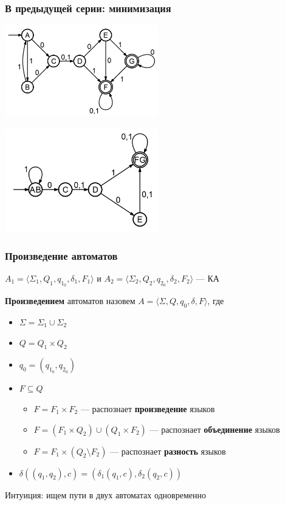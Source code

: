 \documentclass{beamer}
\begin{document}
\begin{frame}[fragile]
  \transwipe[direction=90]
  \frametitle{В предыдущей серии: минимизация}
  \begin{center}
  \includegraphics[width=0.5\textwidth]{pics/2exmin.png}  

  \includegraphics[width=0.5\textwidth]{pics/2exminres.png}  
  \end{center}

\end{frame}

\begin{frame}[fragile]
  \transwipe[direction=90]
  \frametitle{Произведение автоматов}
   $A_1 = \langle \Sigma_1, Q_1, q_{1_0}, \delta_1, F_1 \rangle$ и $A_2 = \langle \Sigma_2, Q_2, q_{2_0}, \delta_2, F_2 \rangle$ --- КА
  
  \textbf{Произведением} автоматов назовем $A = \langle \Sigma, Q, q_0, \delta, F \rangle$, где
  \begin{itemize}
    \item $\Sigma = \Sigma_1 \cup \Sigma_2$
    \item $Q = Q_1 \times Q_2$
    \item $q_0 = (q_{1_0}, q_{2_0})$
    \item $F \subseteq Q$
    \begin{itemize}
      \item $F = F_1 \times F_2$ --- распознает \textbf{произведение} языков
      \item $F = (F_1 \times Q_2) \cup (Q_1 \times F_2)$ --- распознает \textbf{объединение} языков
      \item $F = F_1 \times (Q_2 \setminus F_2)$ --- распознает \textbf{разность} языков
    \end{itemize}
    \item $\delta((q_1, q_2), c) = (\delta_1(q_1, c), \delta_2(q_2, c))$
  \end{itemize}
  
  Интуиция: ищем пути в двух автоматах одновременно
\end{frame}
\end{document}
